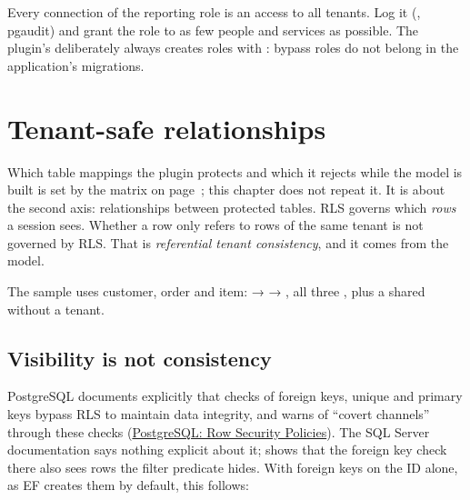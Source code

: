\begin{important}
  Every connection of the reporting role is an access to all tenants. Log it
  (, pgaudit) and grant the role to as few people and
  services as possible. The plugin's 
  deliberately always creates roles with : bypass roles do not belong in
  the application's migrations.
\end{important}

\chapter{Tenant-safe relationships}\label{ch:tenant-safe-relationships}

Which table mappings the plugin protects and which it rejects while the model is built is set by
the matrix on page~\pageref{sec:supported-table-mappings}; this chapter does not repeat it. It is
about the second axis: relationships between protected tables. RLS governs which \emph{rows} a
session sees. Whether a row only refers to rows of the same tenant is not governed by RLS. That
is \emph{referential tenant consistency}, and it comes from the model.

The sample uses customer, order and item:  →  →
, all three , plus a shared
 without a tenant.

\section{Visibility is not consistency}

PostgreSQL documents explicitly that checks of foreign keys, unique and primary keys bypass RLS
to maintain data integrity, and warns of “covert channels” through these checks
(\href{https://www.postgresql.org/docs/17/ddl-rowsecurity.html}{PostgreSQL: Row Security Policies}).
The SQL Server documentation says nothing explicit about it;
 shows that
the foreign key check there also sees rows the filter predicate hides. With foreign keys on the
ID alone, as EF creates them by default, this follows:

